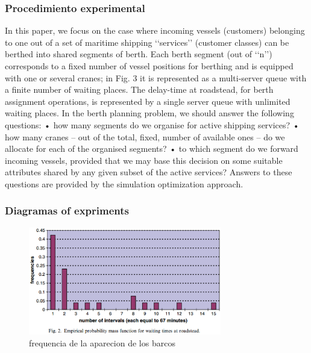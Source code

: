 \documentclass{beamer}
\begin{document}
\begin{frame}
\frametitle{Procedimiento experimental}

In this paper, we focus on the case where incoming vessels (customers) belonging to one out of a set of maritime
shipping ‘‘services’’ (customer classes) can be berthed into shared segments of berth. Each berth segment
(out of ‘‘n’’) corresponds to a fixed number of vessel positions for berthing and is equipped with one or several
cranes; in Fig. 3 it is represented as a multi-server queue with a finite number of waiting places. The delay-time
at roadstead, for berth assignment operations, is represented by a single server queue with unlimited waiting
places.
In the berth planning problem, we should answer the following questions:
• how many segments do we organise for active shipping services?
• how many cranes – out of the total, fixed, number of available ones – do we allocate for each of the organised
segments?
• to which segment do we forward incoming vessels, provided that we may base this decision on some suitable
attributes shared by any given subset of the active services?
Answers to these questions are provided by the simulation optimization approach.

\end{frame}
\begin{frame}
\frametitle{Diagramas of expriments }
\begin{figure}[!th]
\begin{center}
\includegraphics[width=0.75\textwidth]{img/diagrama.eps}
\caption{frequencia de la aparecion de los barcos}
\label{fig:1}
\end{center}
\end{figure}
\end{frame}
\end{document}
